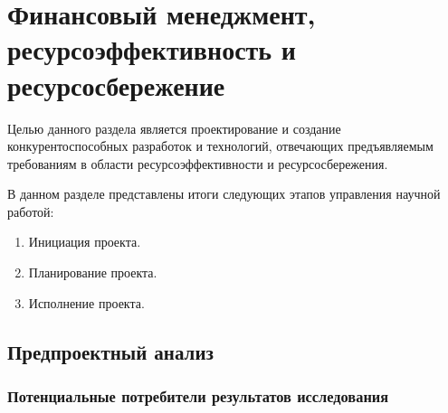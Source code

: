 \section{Финансовый менеджмент, \\ресурсоэффективность и ресурсосбережение}
\label{section:financial}


Целью данного раздела является проектирование и создание конкурентоспособных разработок и технологий, отвечающих предъявляемым требованиям в области ресурсоэффективности и ресурсосбережения.



В данном разделе представлены итоги следующих этапов управления научной работой:
\begin{enumerate}
    \item Инициация проекта.
    \item Планирование проекта.
    \item Исполнение проекта.
\end{enumerate}

\subsection{Предпроектный анализ}

\subsubsection{Потенциальные потребители результатов исследования}


